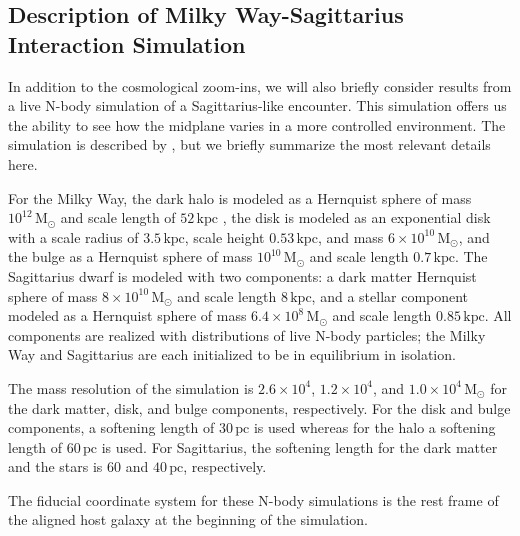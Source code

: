 \documentclass[twocolumn]{aastex62}
\newcommand{\Msun}{\ensuremath{\text{M}_\odot}}
\newcommand{\pc}{\text{pc}}
\newcommand{\kpc}{\text{kpc}}
\begin{document}
\subsection{Description of Milky Way-Sagittarius Interaction Simulation}
\label{ssec:sag_sim}
In addition to the cosmological zoom-ins, we will also briefly consider
results from a live N-body simulation of a Sagittarius-like encounter. This
simulation offers us the ability to see how the midplane varies in a more
controlled environment. The simulation is described by
\citet{2018MNRAS.481..286L}, but we briefly summarize the most relevant
details here.

For the Milky Way, the dark halo is modeled as a Hernquist sphere of mass
$10^{12}\,\Msun$ and scale length of $52\,\kpc$ \citep{1990ApJ...356..359H},
the disk is modeled as an exponential disk with a scale radius of $3.5\,\kpc$,
scale height $0.53\,\kpc$, and mass $6\times10^{10}\,\Msun$, and the bulge as
a Hernquist sphere of mass $10^{10}\,\Msun$ and scale length $0.7\,\kpc$. The
Sagittarius dwarf is modeled with two components: a dark matter Hernquist
sphere of mass $8\times10^{10}\,\Msun$ and scale length $8\,\kpc$, and a
stellar component modeled as a Hernquist sphere of mass $6.4\times10^8\,\Msun$
and scale length $0.85\,\kpc$. All components are realized with distributions
of live N-body particles; the Milky Way and Sagittarius are each initialized
to be in equilibrium in isolation.
 
The mass resolution of the simulation is $2.6\times10^4$, $1.2\times10^4$, and
$1.0\times10^4\,\Msun$ for the dark matter, disk, and bulge components,
respectively. For the disk and bulge components, a softening length of
$30\,\pc$ is used whereas for the halo a softening length of $60\,\pc$ is
used. For Sagittarius, the softening length for the dark matter and the stars
is $60$ and $40\,\pc$, respectively.

The fiducial coordinate system for these N-body simulations is the rest frame
of the aligned host galaxy at the beginning of the simulation.
\end{document}
